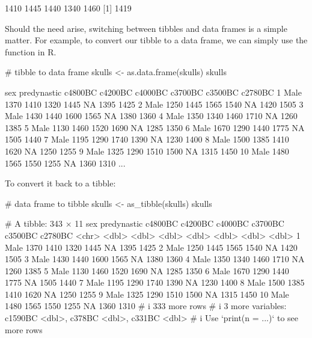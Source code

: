 \begin{outR}
[1] 1410 1445 1440 1340 1460
[1] 1419
\end{outR}

Should the need arise, switching between tibbles and data frames is a simple matter. For example, to convert our tibble  to a data frame, we can simply use the  function in R.

\begin{inR}
# tibble to data frame
skulls <- as.data.frame(skulls)
skulls
\end{inR}
\begin{outR}
   sex  predynastic c4800BC c4200BC c4000BC c3700BC c3500BC c2780BC
1  Male        1370    1410    1320    1445      NA    1395    1425
2  Male        1250    1445    1565    1540      NA    1420    1505
3  Male        1430    1440    1600    1565      NA    1380    1360
4  Male        1350    1340    1460    1710      NA    1260    1385
5  Male        1130    1460    1520    1690      NA    1285    1350
6  Male        1670    1290    1440    1775      NA    1505    1440
7  Male        1195    1290    1740    1390      NA    1230    1400
8  Male        1500    1385    1410    1620      NA    1250    1255
9  Male        1325    1290    1510    1500      NA    1315    1450
10 Male        1480    1565    1550    1255      NA    1360    1310
...
\end{outR}

\noindent
To convert it back to a tibble:
\begin{inR}
# data frame to tibble
skulls <- as_tibble(skulls)
skulls
\end{inR}
\begin{outR}
# A tibble: 343 × 11
   sex   predynastic c4800BC c4200BC c4000BC c3700BC c3500BC c2780BC
   <chr>       <dbl>   <dbl>   <dbl>   <dbl>   <dbl>   <dbl>   <dbl>
 1 Male         1370    1410    1320    1445      NA    1395    1425
 2 Male         1250    1445    1565    1540      NA    1420    1505
 3 Male         1430    1440    1600    1565      NA    1380    1360
 4 Male         1350    1340    1460    1710      NA    1260    1385
 5 Male         1130    1460    1520    1690      NA    1285    1350
 6 Male         1670    1290    1440    1775      NA    1505    1440
 7 Male         1195    1290    1740    1390      NA    1230    1400
 8 Male         1500    1385    1410    1620      NA    1250    1255
 9 Male         1325    1290    1510    1500      NA    1315    1450
10 Male         1480    1565    1550    1255      NA    1360    1310
# i 333 more rows
# i 3 more variables: c1590BC <dbl>, c378BC <dbl>, c331BC <dbl>
# i Use `print(n = ...)` to see more rows
\end{outR}

